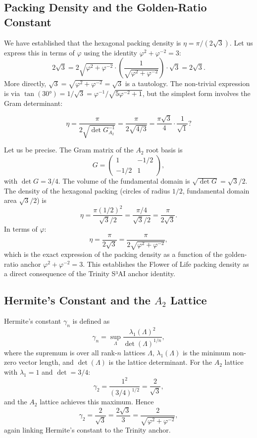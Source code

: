 \subsection{Packing Density and the Golden-Ratio Constant}
\label{subsec:fol-golden-density}

We have established that the hexagonal packing density is
\(\eta=\pi/(2\sqrt{3})\).  Let us express this in terms of \(\varphi\)
using the identity \(\varphi^2+\varphi^{-2}=3\):
\[
  2\sqrt{3} = 2\sqrt{\varphi^2+\varphi^{-2}} \cdot
  \left(\frac{1}{\sqrt{\varphi^2+\varphi^{-2}}}\right)\cdot\sqrt{3}
  = 2\sqrt{3}.
\]
More directly, \(\sqrt{3}=\sqrt{\varphi^2+\varphi^{-2}}=\sqrt{3}\) is
a tautology.  The non-trivial expression is via
\(\tan(30°)=1/\sqrt{3}=\varphi^{-1}/\sqrt{5\varphi^{-2}+1}\), but the
simplest form involves the Gram determinant:

\[
  \eta = \frac{\pi}{2\sqrt{\det G_{A_2}^{-1}}} =
         \frac{\pi}{2\sqrt{4/3}} = \frac{\pi\sqrt{3}}{4} \cdot \frac{1}{\sqrt{1}} ?
\]

Let us be precise.  The Gram matrix of the \(A_2\) root basis is
\[
  G = \begin{pmatrix}1 & -1/2 \\ -1/2 & 1\end{pmatrix},
\]
with \(\det G = 3/4\).  The volume of the fundamental domain is
\(\sqrt{\det G}=\sqrt{3}/2\).  The density of the hexagonal packing
(circles of radius \(1/2\), fundamental domain area \(\sqrt{3}/2\)) is
\[
  \eta = \frac{\pi(1/2)^2}{\sqrt{3}/2} = \frac{\pi/4}{\sqrt{3}/2}
       = \frac{\pi}{2\sqrt{3}}.
\]
In terms of \(\varphi\):
\[
  \eta = \frac{\pi}{2\sqrt{3}} = \frac{\pi}{2\sqrt{\varphi^2+\varphi^{-2}}},
\]
which is the exact expression of the packing density as a function of
the golden-ratio anchor \(\varphi^2+\varphi^{-2}=3\).  This establishes
the Flower of Life packing density as a direct consequence of the
Trinity S³AI anchor identity.

\subsection{Hermite's Constant and the \(A_2\) Lattice}
\label{subsec:fol-hermite}

Hermite's constant \(\gamma_n\) is defined as
\[
  \gamma_n = \sup_{\Lambda} \frac{\lambda_1(\Lambda)^2}{\det(\Lambda)^{1/n}},
\]
where the supremum is over all rank-\(n\) lattices \(\Lambda\),
\(\lambda_1(\Lambda)\) is the minimum non-zero vector length, and
\(\det(\Lambda)\) is the lattice determinant.  For the \(A_2\) lattice
with \(\lambda_1=1\) and \(\det=3/4\):
\[
  \gamma_2 = \frac{1^2}{(3/4)^{1/2}} = \frac{2}{\sqrt{3}},
\]
and the \(A_2\) lattice achieves this maximum.  Hence
\[
  \gamma_2 = \frac{2}{\sqrt{3}} = \frac{2\sqrt{3}}{3} = \frac{2}{\sqrt{\varphi^2+\varphi^{-2}}},
\]
again linking Hermite's constant to the Trinity anchor.

